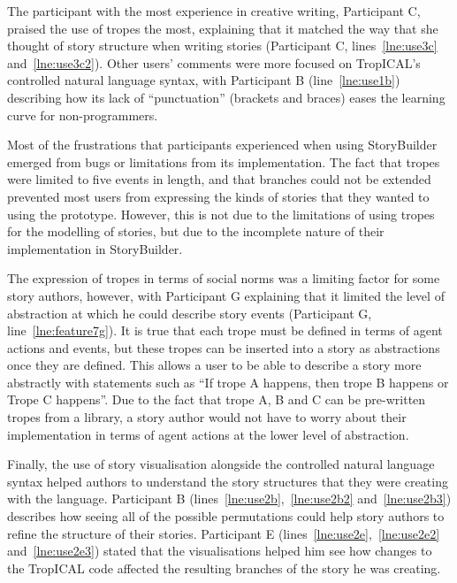 \documentclass[11pt]{report}
\newcommand{\lref}[1]{\hyperlink{llineno:#1}{\ref*{#1}}}
\begin{document}
The participant with the most experience in creative writing, Participant C,
praised the use of tropes the most, explaining that it matched the way that she
thought of story structure when writing stories (Participant C,
lines~\lref{lne:use3c} and~\lref{lne:use3c2}). Other users' comments were
more focused on TropICAL's controlled natural language syntax, with Participant B
(line~\lref{lne:use1b}) describing how its lack of ``punctuation'' (brackets
and braces) eases the learning curve for non-programmers.

Most of the frustrations that participants experienced when using StoryBuilder
emerged from bugs or limitations from its implementation. The fact that tropes
were limited to five events in length, and that branches could not be extended
prevented most users from expressing the kinds of stories that they wanted to
using the prototype. However, this is not due to the limitations of using tropes
for the modelling of stories, but due to the incomplete nature of their
implementation in StoryBuilder.

The expression of tropes in terms of social norms was a limiting factor for some
story authors, however, with Participant G explaining that it limited the level
of abstraction at which he could describe story events (Participant G,
line~\lref{lne:feature7g}). It is true that each trope must be defined in
terms of agent actions and events, but these tropes can be inserted into a story
as abstractions once they are defined. This allows a user to be able to describe
a story more abstractly with statements such as ``If trope A happens, then trope
B happens or Trope C happens''. Due to the fact that trope A, B and C can be
pre-written tropes from a library, a story author would not have to worry about
their implementation in terms of agent actions at the lower level of abstraction.

Finally, the use of story visualisation alongside the controlled natural
language syntax helped authors to understand the story structures that they were
creating with the language. Participant B
(lines~\lref{lne:use2b},~\lref{lne:use2b2} and~\lref{lne:use2b3}) describes
how seeing all of the possible permutations could help story authors to refine
the structure of their stories. Participant E
(lines~\lref{lne:use2e},~\lref{lne:use2e2} and~\lref{lne:use2e3})
stated that the visualisations helped him see how changes to the TropICAL code
affected the resulting branches of the story he was creating.
\end{document}
